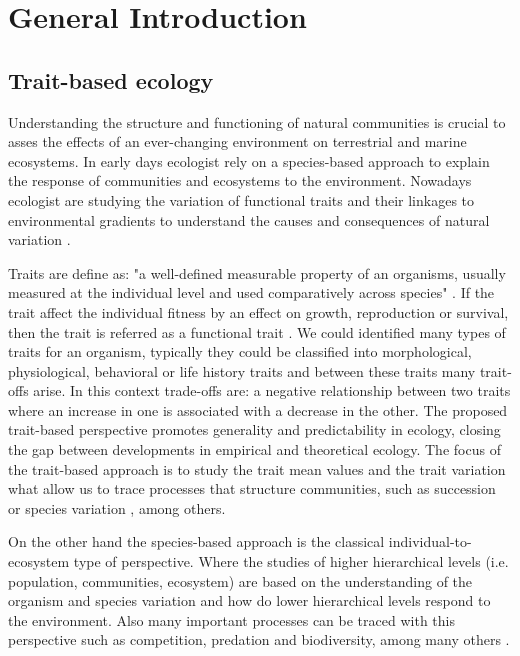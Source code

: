 \chapter{General Introduction}

\section{Trait-based ecology}
Understanding the structure and functioning of natural communities is crucial to asses the effects of an ever-changing environment on terrestrial and marine ecosystems. In early days ecologist rely on a species-based approach to explain the response of communities and ecosystems to the environment. Nowadays ecologist are studying the variation of functional traits and their linkages to environmental gradients to understand the causes and consequences of natural variation \citep{McGill2006,Violle2007}. 

Traits are define as: "a well-defined measurable property of an organisms, usually measured at the individual level and used comparatively across species" \cite{McGill2006}. If the trait affect the individual fitness by an effect on growth, reproduction or survival, then the trait is referred as a functional trait \citep{Violle2007}. We could identified many types of traits for an organism, typically they could be classified into morphological, physiological, behavioral or life history traits and between these traits many trait-offs arise. In this context trade-offs are: a negative relationship between two traits where an increase in one is associated with a decrease in the other. The proposed trait-based perspective promotes generality and predictability in ecology, closing the gap between developments in empirical and theoretical ecology. The focus of the trait-based approach is to study the trait mean values and the trait variation what allow us to trace processes that structure communities, such as succession \citep{Bruggeman2009} or species variation \citep{Ackerly2007,Messier2010}, among others. 

On the other hand the species-based approach is the classical individual-to-ecosystem type of perspective. Where the studies of higher hierarchical levels (i.e. population, communities, ecosystem) are based on the understanding of the organism and species variation and how do lower hierarchical levels respond to the environment. Also many important processes can be traced with this perspective such as competition, predation and biodiversity, among many others \citep{Begon2006}. 

